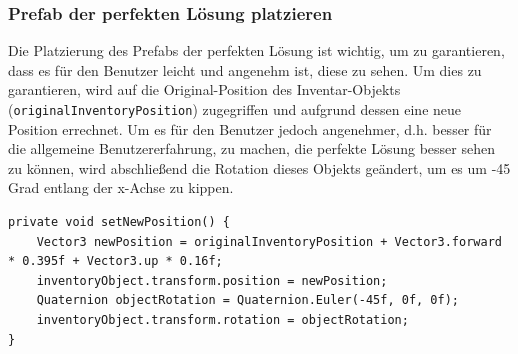 \subsubsection{Prefab der perfekten Lösung platzieren}
Die Platzierung des Prefabs der perfekten Lösung ist wichtig, um zu garantieren, dass es für den Benutzer leicht und
angenehm ist, diese zu sehen. Um dies zu garantieren, wird auf die Original-Position des Inventar-Objekts
(\texttt{originalInventoryPosition}) zugegriffen und aufgrund dessen eine neue Position errechnet. Um es für den Benutzer
jedoch angenehmer, d.h. besser für die allgemeine Benutzererfahrung, zu machen, die perfekte Lösung besser sehen zu
können, wird abschließend die Rotation dieses Objekts geändert, um es um -45 Grad entlang der x-Achse zu kippen.
\begin{lstlisting}[style=csharp, caption={Neue Position setzen}, label=code:newPos_PSV]
private void setNewPosition() {
    Vector3 newPosition = originalInventoryPosition + Vector3.forward * 0.395f + Vector3.up * 0.16f;
    inventoryObject.transform.position = newPosition;
    Quaternion objectRotation = Quaternion.Euler(-45f, 0f, 0f);
    inventoryObject.transform.rotation = objectRotation;
}
\end{lstlisting}\\

